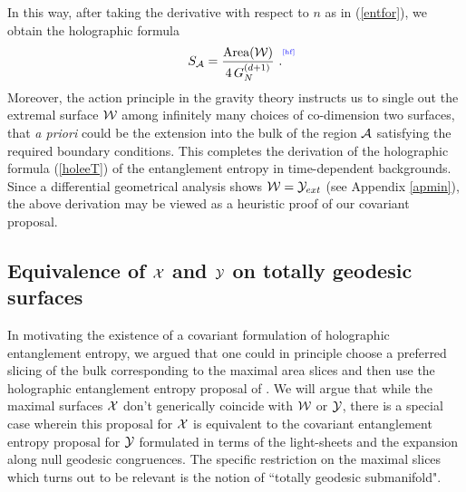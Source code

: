 \documentclass[12pt]{article}
\newcommand{\be}{\begin{equation}}
\newcommand{\ee}{\end{equation}}
\def\req#1{(\ref{#1})}
\def\App#1{Appendix \ref{#1}}
\def\CA{{\cal A}}
\def\CW{{\cal W}}
\def\CX{{\cal X}}
\def\CY{{\cal Y}}
\def\f#1#2{{\frac{#1}{#2}}}
\def\f#1#2{{\frac{#1}{#2}}}
\def\Label#1{\label{#1}%
{ \color{blue}{\smash{\hbox to0pt{\raise2ex\hbox{\tiny[#1]}\hss}}}}}
\def\Gms{\CW}
\def\Lms{\CY}
\def\Xms{\CX}
\def\rA{\CA}
\def\f {\frac}
\begin{document}
In this way, after taking the derivative with respect to $n$ as in \req{entfor},
we obtain the holographic formula
%
\be
S_\rA=\f{\mbox{Area}(\Gms)}{4\,G^{(d+1)}_N} \ .
\Label{hf} \ee
%
Moreover, the action principle in the gravity theory instructs us to
single out the extremal surface $\Gms$ among infinitely many choices
of co-dimension two surfaces, that {\it a priori} could be the
extension into the bulk of the region $\rA$ satisfying the required
boundary conditions.   This completes the derivation of the
holographic formula \req{holeeT} of the entanglement entropy in
time-dependent backgrounds. Since a differential geometrical
analysis shows $\Gms = \Lms_{ext}$ (see \App{apmin}), the above
derivation may be viewed as a heuristic proof of our covariant
proposal.

\subsection{Equivalence of $\Xms$ and $\Lms$ on totally geodesic surfaces}
\label{extminmax}

In motivating the existence of a covariant formulation
of holographic entanglement entropy, we argued that one could in
principle choose a preferred slicing of the bulk corresponding to
the maximal area slices and then use the holographic entanglement
entropy proposal of \cite{Ryu:2006bv, Ryu:2006ef}. We will argue
that while the maximal surfaces $\Xms$ don't generically coincide
with $\Gms$ or $\Lms$, there is a
special case wherein this proposal for $\Xms$ is equivalent to the
covariant entanglement entropy proposal for $\Lms$ formulated in
terms of the light-sheets and the expansion along null geodesic
congruences.  The specific restriction on the maximal slices which turns out to
be relevant is the notion of ``totally geodesic submanifold".
\end{document}
